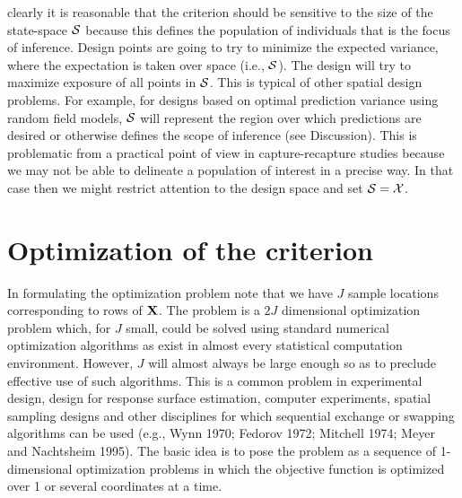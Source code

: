 \documentclass[useAMS,referee]{biom}
\begin{document}
 clearly it is reasonable that 
the criterion should be sensitive to
the size of the state-space ${\cal S}$ because this defines the
population of individuals that is the focus of inference.  Design
points are going to try to minimize the expected variance, where the
expectation is taken over space (i.e., ${\cal S}$). The design will
try to maximize exposure of all points in ${\cal S}$. 
This is typical of 
other spatial design problems. For example, for designs based on
optimal prediction variance using random field models, ${\cal S}$ will
represent the region over which predictions are desired or otherwise
defines the scope of inference (see Discussion).  This is problematic
from a practical point of view in capture-recapture studies because we
may not be able to delineate a population of interest in a precise
way. In that case then we might restrict attention to the design space
and set ${\cal S} = {\cal X}$.  








\section{Optimization of the criterion}

In formulating the optimization problem note that we have $J$ sample
locations corresponding to rows of ${\bf X}$.  The problem is a $2J$
dimensional optimization problem which, for $J$ small, could be solved
using standard numerical optimization algorithms as exist in almost
every statistical computation environment.  However, $J$ will almost
always be large enough so as to preclude effective use of such
algorithms. This is a common problem in experimental design, design
for response surface estimation, computer experiments, spatial
sampling designs and other disciplines for which sequential exchange
or swapping algorithms can be used (e.g., Wynn 1970; 
Fedorov 1972; Mitchell 1974; Meyer and
Nachtsheim 1995). The basic idea is to pose the problem as a sequence
of 1-dimensional optimization problems in which the objective function
is optimized over 1 or several coordinates at a time.
\end{document}
